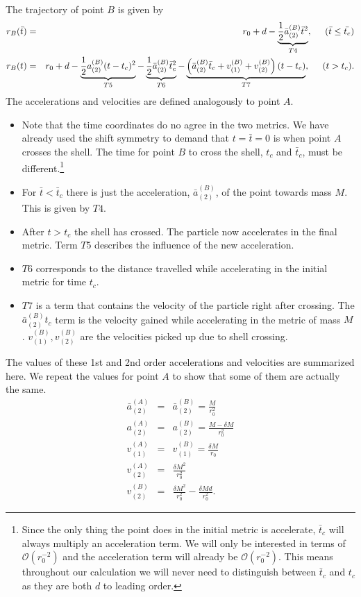 \documentclass[aps,showpacs,onecolumn,floats,prd,superscriptaddress,nofootinbib]{revtex4-1}
\begin{document}
The trajectory of point $B$ is given by
\begin{eqnarray}
	r_B(\bar{t}) & = &  r_0 + d  - \underbrace{\frac{1}{2} \bar{a}_{(2)}^{(B)} \bar{t}^2}_{T4},  \hspace{5mm} (\bar{t} \leq \bar{t_c})	\nonumber	\\
	r_B(t) & = & r_0 +d  - \underbrace{\frac{1}{2} a_{(2)}^{(B)}(t-t_c)^2}_{T5} -  \underbrace{\frac{1}{2}  \bar{a}^{(B)}_{(2)} \bar{t}_c^2}_{T6} - \underbrace{\left( \bar{a}_{(2)}^{(B)} \bar{t}_c + v^{(B)}_{(1)} + v^{(B)}_{(2)} \right)(t-t_c)}_{T7} ,  \hspace{5mm}  (t>t_c).	\label{rB}
\end{eqnarray}
The accelerations and velocities are defined analogously to point $A$. 
\begin{itemize}
\item Note that the time coordinates do no agree in the two metrics. 
We have already used the shift symmetry to demand that $t=\bar{t}=0$ is when point $A$ crosses the shell.
The time for point $B$ to cross the shell, $t_c$ and $\bar{t}_c$, must be different.\footnote{Since the only thing the point does in the initial metric is accelerate, $\bar{t}_c$ will always multiply an acceleration term. We will only be interested in terms of $\mathcal{O}(r_0^{-2})$ and the acceleration term will already be $\mathcal{O}(r_0^{-2})$. This means throughout our calculation we will never need to distinguish between $\bar{t}_c$ and $t_c$ as they are both $d$ to leading order.}
\item For $\bar{t} <\bar{t}_c$ there is just the acceleration, $\bar{a}^{(B)}_{(2)}$, of the point towards mass $M$. This is given by $T4$.  
\item After $t>t_c$ the shell has crossed. The particle now accelerates in the final metric.
Term $T5$ describes the influence of the new acceleration. 
\item $T6$ corresponds to the distance travelled while accelerating in the initial metric for time $t_c$. 
\item $T7$ is a term that contains the velocity of the particle right after crossing. The $\bar{a}^{(B)}_{(2)} t_c$ term is the velocity gained while accelerating in the metric of mass $M$. $v_{(1)}^{(B)}, v_{(2)}^{(B)}$ are the velocities picked up due to shell crossing.
\end{itemize}
The values of these 1st and 2nd order accelerations and velocities are summarized here.
We repeat the values for point $A$ to show that some of them are actually the same.
\begin{eqnarray}
	\bar{a}^{(A)}_{(2)} & = & \bar{a}^{(B)}_{(2)} =  \frac{M}{r_0^2}	\nonumber	\\
	a^{(A)}_{(2)} & = & a^{(B)}_{(2)}=  \frac{M - \delta M}{r_0^2}	\nonumber	\\
	v^{(A)}_{(1)} & = & v^{(B)}_{(1)} =  \frac{\delta M}{r_0} 	\nonumber	\\
	v^{(A)}_{(2)} & = &  \frac{\delta M^2}{r_0^2}		\nonumber	\\
	v^{(B)}_{(2)} & = & \frac{\delta M^2}{r_0^2} - \frac{\delta M d}{r_0^2}.		
\end{eqnarray}
\end{document}
